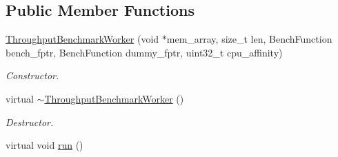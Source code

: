 \subsection*{Public Member Functions}
\begin{DoxyCompactItemize}
\item 
\hyperlink{classxmem_1_1benchmark_1_1_throughput_benchmark_worker_a271c77940bc7cb45fcc395d3ed14361c}{Throughput\-Benchmark\-Worker} (void $\ast$mem\-\_\-array, size\-\_\-t len, Bench\-Function bench\-\_\-fptr, Bench\-Function dummy\-\_\-fptr, uint32\-\_\-t cpu\-\_\-affinity)
\begin{DoxyCompactList}\small\item\em Constructor. \end{DoxyCompactList}\item 
\hypertarget{classxmem_1_1benchmark_1_1_throughput_benchmark_worker_a021aae8513f5da78e04ba711e308b705}{virtual \hyperlink{classxmem_1_1benchmark_1_1_throughput_benchmark_worker_a021aae8513f5da78e04ba711e308b705}{$\sim$\-Throughput\-Benchmark\-Worker} ()}\label{classxmem_1_1benchmark_1_1_throughput_benchmark_worker_a021aae8513f5da78e04ba711e308b705}

\begin{DoxyCompactList}\small\item\em Destructor. \end{DoxyCompactList}\item 
\hypertarget{classxmem_1_1benchmark_1_1_throughput_benchmark_worker_afb71dd763f55504ddabcabb24e0d6834}{virtual void \hyperlink{classxmem_1_1benchmark_1_1_throughput_benchmark_worker_afb71dd763f55504ddabcabb24e0d6834}{run} ()}\label{classxmem_1_1benchmark_1_1_throughput_benchmark_worker_afb71dd763f55504ddabcabb24e0d6834}


\end{DoxyCompactItemize}
